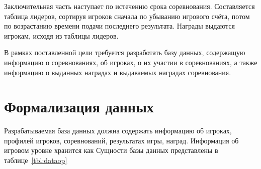 Заключительная часть наступает по истечению срока соревнования. Составляется таблица лидеров, сортируя игроков сначала по убыванию игрового счёта, потом по возрастанию времени подачи последнего результата. Награды выдаются игрокам, исходя из таблицы лидеров. 









В рамках поставленной цели требуется разработать базу данных, содержащую информацию о соревнованиях, об игроках, о их участии в соревнованиях, а также информацию о выданных наградах и выдаваемых наградах соревнования.


\section{Формализация данных}
Разрабатываемая база данных должна содержать информацию об игроках, профилей игроков, соревнований, результатах игры, наград. Информация об игровом уровне хранится как Сущности базы данных представлены в таблице~\ref{tbl:dataop}

